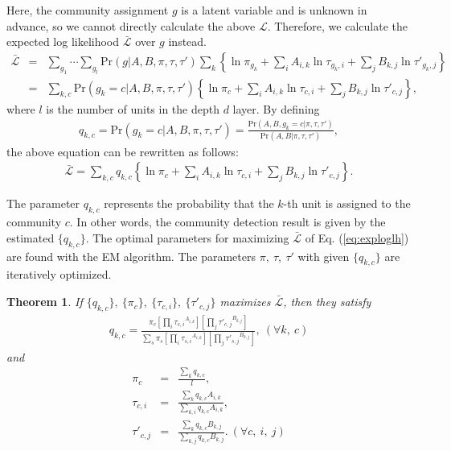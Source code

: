 \documentclass[12pt]{article} %
\newtheorem{theo}{Theorem}[section]
\begin{document}
Here, the community assignment $g$ is a latent variable and is unknown in advance, so we cannot directly calculate the above $\mathcal{L}$. Therefore, we calculate the expected log likelihood $\bar{\mathcal{L}}$ over $g$ instead. 
\begin{eqnarray*}
  \bar{\mathcal{L}} &=& \sum_{g_1}\cdots \sum_{g_l} \mathrm{Pr} (g|A,B,\pi,\tau,\tau') \sum_k \left\{ \ln \pi_{g_k} +\sum_i A_{i,k} \ln \tau_{g_k,i} +\sum_j B_{k,j} \ln \tau'_{g_k,j} \right\}\\
  &=& \sum_{k,c} \mathrm{Pr}(g_k=c|A,B,\pi,\tau,\tau') \left\{ \ln \pi_c +\sum_i A_{i,k} \ln \tau_{c,i} +\sum_j B_{k,j} \ln \tau'_{c,j} \right\},
\end{eqnarray*}
where $l$ is the number of units in the depth $d$ layer. By defining
\begin{eqnarray}
  q_{k,c}=\mathrm{Pr}(g_k=c|A,B,\pi,\tau,\tau')=\frac{\mathrm{Pr}(A,B,g_k=c|\pi,\tau,\tau')}{\mathrm{Pr}(A,B|\pi,\tau,\tau')},
  \label{eq:qdefine}
\end{eqnarray}
the above equation can be rewritten as follows:
\begin{eqnarray}
  \bar{\mathcal{L}}=\sum_{k,c} q_{k,c} \left\{ \ln \pi_c +\sum_i A_{i,k} \ln \tau_{c,i} +\sum_j B_{k,j} \ln \tau'_{c,j} \right\}.
  \label{eq:exploglh}
\end{eqnarray}

The parameter $q_{k,c}$ represents the probability that the $k$-th unit is assigned to the community $c$. In other words, the community detection result is given by the estimated $\{q_{k,c}\}$. The optimal parameters for maximizing $\bar{\mathcal{L}}$ of Eq. (\ref{eq:exploglh}) are found with the EM algorithm. The parameters $\pi,\ \tau,\ \tau'$ with given $\{q_{k,c}\}$ are iteratively optimized.

\begin{theo}
If $\{q_{k,c}\},\ \{\pi_c\},\ \{\tau_{c,i}\},\ \{\tau'_{c,j}\}$ maximizes $\bar{\mathcal{L}}$, then they satisfy 
\begin{eqnarray}
  q_{k,c}=\frac{\pi_c \left[ \prod_i {\tau_{c,i}}^{A_{i,k}} \right] \left[ \prod_j {\tau'_{c,j}}^{B_{k,j}} \right]}{\sum_s \pi_s \left[ \prod_i {\tau_{s,i}}^{A_{i,k}} \right] \left[ \prod_j {\tau'_{s,j}}^{B_{k,j}} \right]},\ (\forall k,\ c)
  \label{eq:q}
\end{eqnarray}
and
\begin{eqnarray}
  \pi_c &=& \frac{\sum_k q_{k,c}}{l},\nonumber \\
  \tau_{c,i} &=& \frac{\sum_k q_{k,c} A_{i,k}}{\sum_{k,i} q_{k,c} A_{i,k}},\nonumber \\
  \tau'_{c,j} &=& \frac{\sum_k q_{k,c} B_{k,j}}{\sum_{k,j} q_{k,c} B_{k,j}}.\ (\forall c,\ i,\ j)
  \label{eq:pitau}
\end{eqnarray}
\end{theo}
\end{document}
